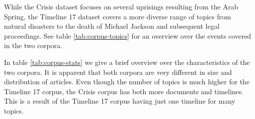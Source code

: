 \documentclass[a4paper,BCOR=10mm]{report}
\numberwithin{lemma}{chapter}
\numberwithin{definition}{chapter}
\begin{document}
While the Crisis dataset focuses on several uprisings resulting from the Arab Spring, the Timeline 17 dataset covers a more diverse range of topics from natural disasters to the death of Michael Jackson and subsequent legal proceedings. See table \ref{tab:corpus-topics} for an overview over the events covered in the two corpora.

In table \ref{tab:corpus-stats} we give a brief overview over the characteristics of the two corpora. It is apparent that both corpora are very different in size and distribution of articles. Even though the number of topics is much higher for the Timeline 17 corpus, the Crisis corpus has both more documents and timelines. This is a result of the Timeline 17 corpus having just one timeline for many topics.

\begin{table}
\begin{centering}

\end{centering}

\caption{Statistics for our evaluation corpora}
\label{tab:corpus-stats}
\end{table}

\begin{table}
\begin{centering}
\end{centering}

\caption{Topics of our evaluation corpora}
\label{tab:corpus-topics}
\end{table}
\end{document}
